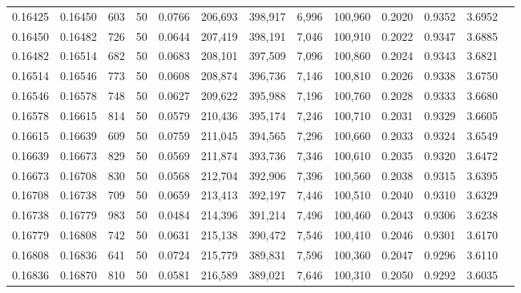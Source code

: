 \begin{tabular}{rrrrrrrrrrrrr}
0.16425 & 0.16450 &   603 &  50 &                                     0.0766 & 206,693 & 398,917 &   6,996 & 100,960 & 0.2020 & 0.9352 & 3.6952 \\
0.16450 & 0.16482 &   726 &  50 &                                     0.0644 & 207,419 & 398,191 &   7,046 & 100,910 & 0.2022 & 0.9347 & 3.6885 \\
0.16482 & 0.16514 &   682 &  50 &                                     0.0683 & 208,101 & 397,509 &   7,096 & 100,860 & 0.2024 & 0.9343 & 3.6821 \\
0.16514 & 0.16546 &   773 &  50 &                                     0.0608 & 208,874 & 396,736 &   7,146 & 100,810 & 0.2026 & 0.9338 & 3.6750 \\
0.16546 & 0.16578 &   748 &  50 &                                     0.0627 & 209,622 & 395,988 &   7,196 & 100,760 & 0.2028 & 0.9333 & 3.6680 \\
0.16578 & 0.16615 &   814 &  50 &                                     0.0579 & 210,436 & 395,174 &   7,246 & 100,710 & 0.2031 & 0.9329 & 3.6605 \\
0.16615 & 0.16639 &   609 &  50 &                                     0.0759 & 211,045 & 394,565 &   7,296 & 100,660 & 0.2033 & 0.9324 & 3.6549 \\
0.16639 & 0.16673 &   829 &  50 &                                     0.0569 & 211,874 & 393,736 &   7,346 & 100,610 & 0.2035 & 0.9320 & 3.6472 \\
0.16673 & 0.16708 &   830 &  50 &                                     0.0568 & 212,704 & 392,906 &   7,396 & 100,560 & 0.2038 & 0.9315 & 3.6395 \\
0.16708 & 0.16738 &   709 &  50 &                                     0.0659 & 213,413 & 392,197 &   7,446 & 100,510 & 0.2040 & 0.9310 & 3.6329 \\
0.16738 & 0.16779 &   983 &  50 &                                     0.0484 & 214,396 & 391,214 &   7,496 & 100,460 & 0.2043 & 0.9306 & 3.6238 \\
0.16779 & 0.16808 &   742 &  50 &                                     0.0631 & 215,138 & 390,472 &   7,546 & 100,410 & 0.2046 & 0.9301 & 3.6170 \\
0.16808 & 0.16836 &   641 &  50 &                                     0.0724 & 215,779 & 389,831 &   7,596 & 100,360 & 0.2047 & 0.9296 & 3.6110 \\
0.16836 & 0.16870 &   810 &  50 &                                     0.0581 & 216,589 & 389,021 &   7,646 & 100,310 & 0.2050 & 0.9292 & 3.6035 \\

\end{tabular}
